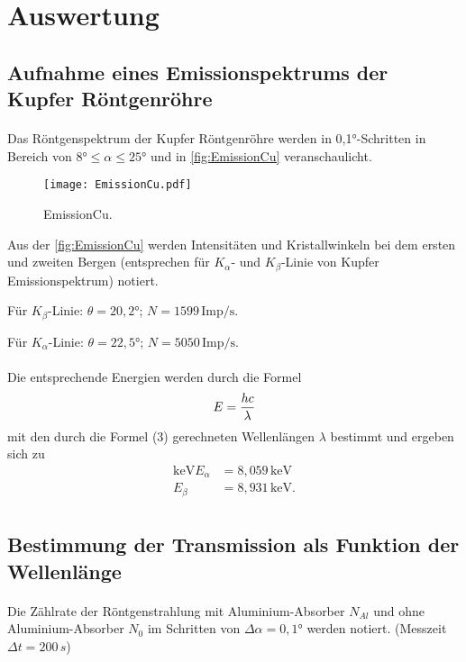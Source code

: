 \section{Auswertung}
\label{sec:Auswertung}
\subsection{Aufnahme eines Emissionspektrums der Kupfer Röntgenröhre}
\paragraph{}
Das Röntgenspektrum der Kupfer Röntgenröhre \cite{AL} werden in 0,1°-Schritten in Bereich  von \(8° \leq \alpha \leq 25°\) und in \autoref{fig:EmissionCu} veranschaulicht.

\begin{figure}
  \centering
  \texttt{[image: EmissionCu.pdf]}
  \caption{EmissionCu.}
  \label{fig:EmissionCu}
\end{figure}
 
Aus der \autoref{fig:EmissionCu} werden Intensitäten und Kristallwinkeln bei dem ersten und zweiten Bergen (entsprechen für $K_\alpha$- und $K_\beta$-Linie von Kupfer Emissionspektrum) notiert.

Für $K_\beta$-Linie: \(\theta=20,2°\); \(N=1599 \,\mathrm{Imp/s}\).

Für $K_\alpha$-Linie: \(\theta=22,5°\); \(N=5050 \, \mathrm{Imp/s}\). 

\paragraph{}
Die entsprechende Energien werden durch die Formel
\begin{equation}
  E = \frac{hc}{\lambda}\\
 \end{equation}
mit den durch die Formel (3) gerechneten Wellenlängen $\lambda$
bestimmt und ergeben sich zu
\begin{align*}\mathrm{keV}
  E_\alpha &= 8,059\,\mathrm{keV}\\
  E_\beta &= 8,931 \,\mathrm{keV}.\\
\end{align*}


\subsection{ Bestimmung der Transmission als Funktion der Wellenlänge}
\paragraph{}
Die Zählrate der Röntgenstrahlung mit Aluminium-Absorber $N_{Al}$ und ohne Aluminium-Absorber $N_0$ im Schritten von \( \Delta \alpha= 0,1° \) werden notiert.\cite{AL} (Messzeit \(\Delta t=200 \,s \))\\

